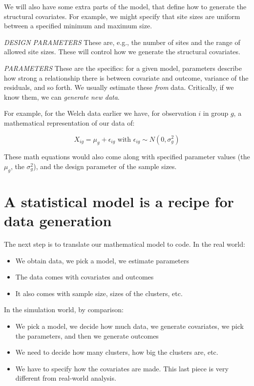 \documentclass[
]{book}
\providecommand{\tightlist}{%
  \setlength{\itemsep}{0pt}\setlength{\parskip}{0pt}}
\begin{document}
We will also have some extra parts of the model, that define how to generate the structural covariates.
For example, we might specify that site sizes are uniform between a specified minimum and maximum size.

\emph{DESIGN PARAMETERS}
These are, e.g., the number of sites and the range of allowed site sizes.
These will control how we generate the structural covariates.

\emph{PARAMETERS}
These are the specifics: for a given model, parameters describe how strong a relationship there is between covariate and outcome, variance of the residuals, and so forth.
We usually estimate these \emph{from} data.
Critically, if we know them, we can \emph{generate new data}.

For example, for the Welch data earlier we have, for observation \(i\) in group \(g\), a mathematical representation of our data of:

\[ X_{ig} = \mu_g + \epsilon_{ig} \mbox{ with } \epsilon_{ig} \sim N( 0, \sigma^2_g ) \]

These math equations would also come along with specified parameter values (the \(\mu_g\), the \(\sigma^2_g\)), and the design parameter of the sample sizes.

\hypertarget{a-statistical-model-is-a-recipe-for-data-generation}{%
\section{A statistical model is a recipe for data generation}\label{a-statistical-model-is-a-recipe-for-data-generation}}

The next step is to translate our mathematical model to code.
In the real world:

\begin{itemize}
\tightlist
\item
  We obtain data, we pick a model, we estimate parameters
\item
  The data comes with covariates and outcomes
\item
  It also comes with sample size, sizes of the clusters, etc.
\end{itemize}

In the simulation world, by comparison:

\begin{itemize}
\tightlist
\item
  We pick a model, we decide how much data, we generate covariates, we pick the parameters, and then we generate outcomes
\item
  We need to decide how many clusters, how big the clusters are, etc.
\item
  We have to specify how the covariates are made. This last piece is very different from real-world analysis.
\end{itemize}
\end{document}
